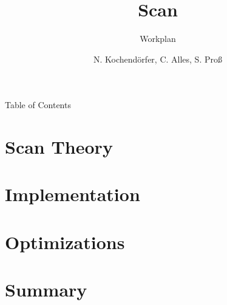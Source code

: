 \documentclass[compress, 11pt]{beamer}
\title[Scan]{Scan}
\subtitle{Workplan}
\author{N. Kochendörfer, C. Alles, S. Proß}
\begin{document}
\frame{\titlepage}

\begin{frame}{Table of Contents}
    \tableofcontents
    
    \note{
    }
\end{frame}

\section{Scan Theory} %


\section{Implementation} %




\section{Optimizations} %






\section{Summary}

\end{document}
